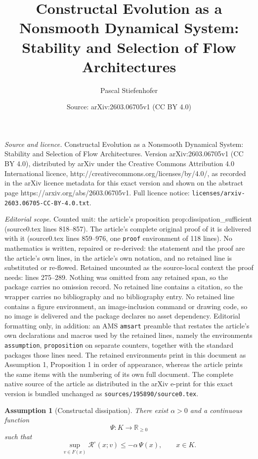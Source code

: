 \documentclass[10pt,a4paper]{amsart}
\title{Constructal Evolution as a Nonsmooth Dynamical System: Stability and Selection of Flow Architectures}
\author{Pascal Stiefenhofer}
\date{Source: arXiv:2603.06705v1 (CC BY 4.0)}
\newtheorem{assumption}{Assumption}
\begin{document}
\maketitle

\noindent\emph{Source and licence.} Constructal Evolution as a Nonsmooth Dynamical System: Stability and Selection of Flow Architectures. Version arXiv:2603.06705v1 (CC BY 4.0), distributed by arXiv under the Creative Commons Attribution 4.0 International licence, http://creativecommons.org/licenses/by/4.0/, as recorded in the arXiv licence metadata for this exact version and shown on the abstract page https://arxiv.org/abs/2603.06705v1. Full licence notice: \texttt{licenses/arxiv-2603.06705-CC-BY-4.0.txt}.\par\smallskip

\noindent\textit{Editorial scope.} Counted unit: the article's proposition prop:dissipation\_sufficient (source0.tex lines 818--857). The article's complete original proof of it is delivered with it (source0.tex lines 859--976, one \texttt{proof} environment of 118 lines). No mathematics is written, repaired or re-derived: the statement and the proof are the article's own lines, in the article's own notation, and no retained line is substituted or re-flowed.  Retained uncounted as the source-local context the proof needs: lines 275--289.  Nothing was omitted from any retained span, so the package carries no omission record.  No retained line contains a citation, so the wrapper carries no bibliography and no bibliography entry.  No retained line contains a figure environment, an image-inclusion command or drawing code, so no image is delivered and the package declares no asset dependency.  Editorial formatting only, in addition: an AMS \texttt{amsart} preamble that restates the article's own declarations and macros used by the retained lines, namely the environments \texttt{assumption}, \texttt{proposition} on separate counters, together with the standard packages those lines need.  The retained environments print in this document as Assumption 1, Proposition 1 in order of appearance, whereas the article prints the same items with the numbering of its own full document.  The complete native source of the article as distributed in the arXiv e-print for this exact version is bundled unchanged as \texttt{sources/195890/source0.tex}.
\begin{assumption}[Constructal dissipation]
\label{ass:dissipation}
There exist $\alpha>0$ and a continuous function
\[
\Psi:K\to\mathbb{R}_{\ge0}
\]
such that
\begin{equation}
\sup_{v\in F(x)}
\mathcal{R}^\circ(x;v)
\le -\alpha\,\Psi(x),
\qquad x\in K .
\label{eq:dissipation_condition}
\end{equation}
\end{assumption}
\end{document}
